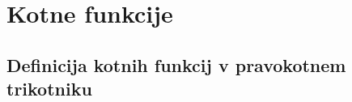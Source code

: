 \section{Kotne funkcije}

\begin{frame}
    \sectionpage
\end{frame}

\begin{frame}
\end{frame}

    \subsection{Definicija kotnih funkcij v pravokotnem trikotniku}

        
